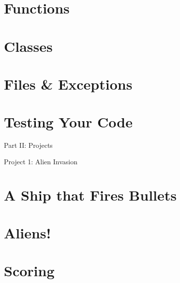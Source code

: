 \documentclass[oneside]{book}
\numberwithin{equation}{section}
\begin{document}
\section{Functions}


\section{Classes}


\section{Files \& Exceptions}


\section{Testing Your Code}


\begin{center}
	\huge Part II: Projects
\end{center}

\begin{center}
	\Large Project 1: Alien Invasion
\end{center}

\section{A Ship that Fires Bullets}


\section{Aliens!}


\section{Scoring}
\end{document}
